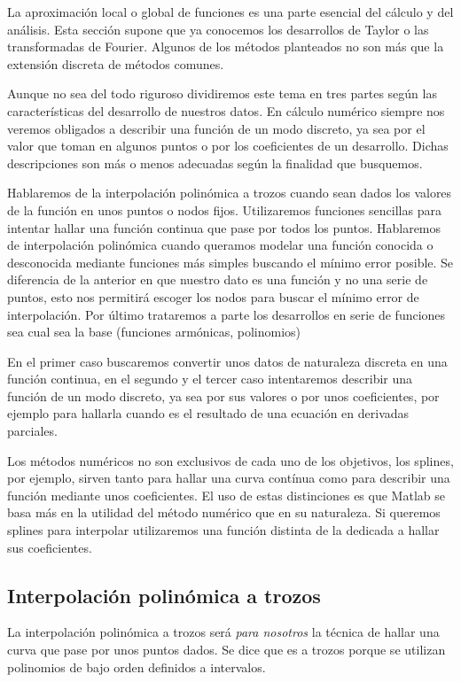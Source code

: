La aproximación local o global de funciones es una parte esencial del
cálculo y del análisis.  Esta sección supone que ya conocemos los
desarrollos de Taylor o las transformadas de Fourier.  Algunos de los
métodos planteados no son más que la extensión discreta de métodos
comunes.

Aunque no sea del todo riguroso dividiremos este tema en tres partes
según las características del desarrollo de nuestros datos.  En
cálculo numérico siempre nos veremos obligados a describir una función
de un modo discreto, ya sea por el valor que toman en algunos puntos o
por los coeficientes de un desarrollo.  Dichas descripciones son más o
menos adecuadas según la finalidad que busquemos.

Hablaremos de la interpolación polinómica a trozos cuando sean dados
los valores de la función en unos puntos o nodos fijos.  Utilizaremos
funciones sencillas para intentar hallar una función continua que pase
por todos los puntos.  Hablaremos de interpolación polinómica cuando
queramos modelar una función conocida o desconocida mediante funciones
más simples buscando el mínimo error posible.  Se diferencia de la
anterior en que nuestro dato es una función y no una serie de puntos,
esto nos permitirá escoger los nodos para buscar el mínimo error de
interpolación.  Por último trataremos a parte los desarrollos en serie
de funciones sea cual sea la base (funciones armónicas, polinomios)

En el primer caso buscaremos convertir unos datos de naturaleza
discreta en una función continua, en el segundo y el tercer caso
intentaremos describir una función de un modo discreto, ya sea por sus
valores o por unos coeficientes, por ejemplo para hallarla cuando es
el resultado de una ecuación en derivadas parciales.

Los métodos numéricos no son exclusivos de cada uno de los objetivos,
los splines, por ejemplo, sirven tanto para hallar una curva contínua
como para describir una función mediante unos coeficientes.  El uso de
estas distinciones es que Matlab se basa más en la utilidad del método
numérico que en su naturaleza.  Si queremos splines para interpolar
utilizaremos una función distinta de la dedicada a hallar sus
coeficientes.

\subsection{Interpolación polinómica a trozos}

La interpolación polinómica a trozos será \emph{para nosotros} la
técnica de hallar una curva que pase por unos puntos dados.  Se dice
que es a trozos porque se utilizan polinomios de bajo orden definidos
a intervalos.


